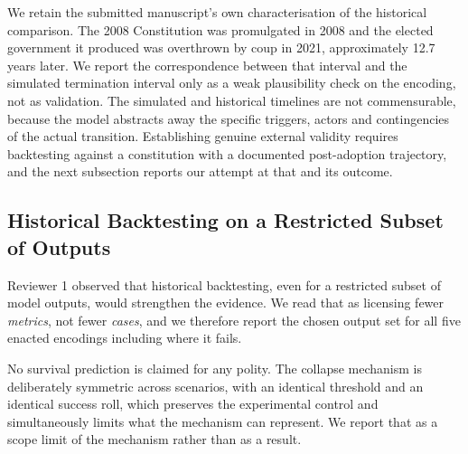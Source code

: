 \documentclass{ieeeaccess}
\newif\ifpendingvisible
\newcommand{\todo}[1]{%
  \ifpendingvisible\textcolor{red}{\textbf{[\MakeUppercase{#1}]}}\fi}
\begin{document}
We retain the submitted manuscript's own characterisation of the
historical comparison. The 2008 Constitution was promulgated in 2008 and
the elected government it produced was overthrown by coup in 2021,
approximately 12.7 years later. We report the correspondence between
that interval and the simulated termination interval only as a weak
plausibility check on the encoding, not as validation. The simulated and
historical timelines are not commensurable, because the model abstracts
away the specific triggers, actors and contingencies of the actual
transition. Establishing genuine external validity requires backtesting
against a constitution with a documented post-adoption trajectory, and
the next subsection reports our attempt at that and its outcome.
\todo{PENDING DECISION: the Myanmar anchoring convention is unresolved.
Promulgation to coup is 12.68 years; the operative instrument from 2011
to 2021 is 10.01 years. Whichever is chosen must be applied identically
to Pakistan, where the corresponding intervals are 14.61 and 13.92
years.}

\subsection{Historical Backtesting on a Restricted Subset of Outputs}
Reviewer 1 observed that historical backtesting, even for a restricted
subset of model outputs, would strengthen the evidence. We read that as
licensing fewer \emph{metrics}, not fewer \emph{cases}, and we therefore
report the chosen output set for all five enacted encodings including
where it fails.
\todo{PENDING CAMPAIGN: the backtest table. Rows: all five enacted
encodings. Columns: simulated value, real-world observation, source, and
an explicit verdict including failures. The provisional free-run survey
at reduced $N$ indicates that one case matches its real duration
closely, one survives the full horizon as it did historically, one makes
an out-of-sample prediction beyond its real observation window, and one
over-survives its real duration by roughly 60 percent. None of those
four statements may be printed until the campaign confirms them at the
publication $N$.}

No survival prediction is claimed for any polity. The collapse mechanism
is deliberately symmetric across scenarios, with an identical threshold
and an identical success roll, which preserves the experimental control
and simultaneously limits what the mechanism can represent. We report
that as a scope limit of the mechanism rather than as a result.
\end{document}
